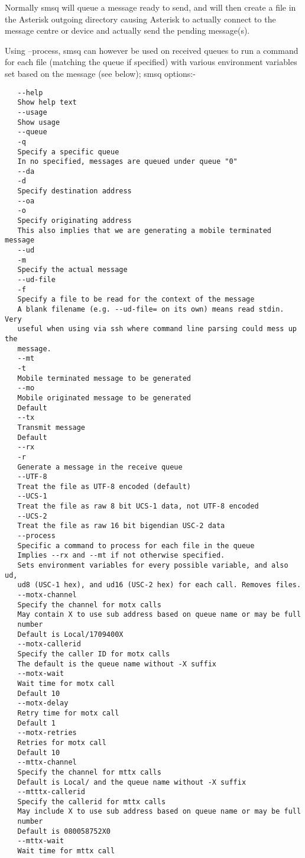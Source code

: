    Normally smsq will queue a message ready to send, and will then create
   a file in the Asterisk outgoing directory causing Asterisk to actually
   connect to the message centre or device and actually send the pending
   message(s).

   Using --process, smsq can however be used on received queues to run a
   command for each file (matching the queue if specified) with various
   environment variables set based on the message (see below);
   smsq options:-
\begin{verbatim}
   --help
   Show help text
   --usage
   Show usage
   --queue
   -q
   Specify a specific queue
   In no specified, messages are queued under queue "0"
   --da
   -d
   Specify destination address
   --oa
   -o
   Specify originating address
   This also implies that we are generating a mobile terminated message
   --ud
   -m
   Specify the actual message
   --ud-file
   -f
   Specify a file to be read for the context of the message
   A blank filename (e.g. --ud-file= on its own) means read stdin. Very
   useful when using via ssh where command line parsing could mess up the
   message.
   --mt
   -t
   Mobile terminated message to be generated
   --mo
   Mobile originated message to be generated
   Default
   --tx
   Transmit message
   Default
   --rx
   -r
   Generate a message in the receive queue
   --UTF-8
   Treat the file as UTF-8 encoded (default)
   --UCS-1
   Treat the file as raw 8 bit UCS-1 data, not UTF-8 encoded
   --UCS-2
   Treat the file as raw 16 bit bigendian USC-2 data
   --process
   Specific a command to process for each file in the queue
   Implies --rx and --mt if not otherwise specified.
   Sets environment variables for every possible variable, and also ud,
   ud8 (USC-1 hex), and ud16 (USC-2 hex) for each call. Removes files.
   --motx-channel
   Specify the channel for motx calls
   May contain X to use sub address based on queue name or may be full
   number
   Default is Local/1709400X
   --motx-callerid
   Specify the caller ID for motx calls
   The default is the queue name without -X suffix
   --motx-wait
   Wait time for motx call
   Default 10
   --motx-delay
   Retry time for motx call
   Default 1
   --motx-retries
   Retries for motx call
   Default 10
   --mttx-channel
   Specify the channel for mttx calls
   Default is Local/ and the queue name without -X suffix
   --mtttx-callerid
   Specify the callerid for mttx calls
   May include X to use sub address based on queue name or may be full
   number
   Default is 080058752X0
   --mttx-wait
   Wait time for mttx call

\end{verbatim}
